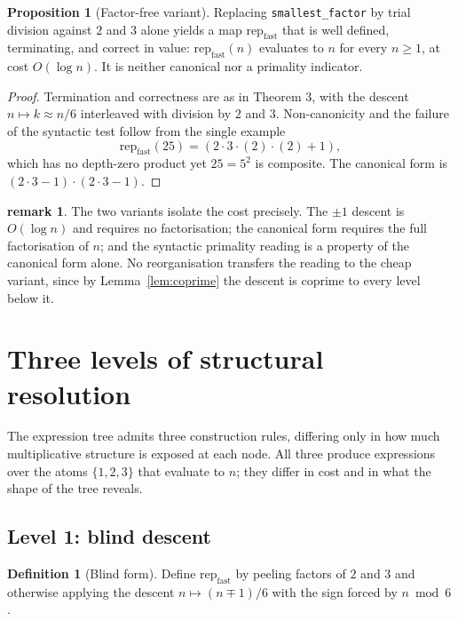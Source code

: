 \documentclass[11pt]{article}
\theoremstyle{definition}
\newtheorem{definition}{Definition}
\newtheorem{proposition}{Proposition}
\newtheorem{remark}{remark}
\begin{document}
\begin{proposition}[Factor-free variant]
Replacing \texttt{smallest\_factor} by trial division against $2$ and $3$
alone yields a map $\mathrm{rep}_{\mathrm{fast}}$ that is well defined,
terminating, and correct in value: $\mathrm{rep}_{\mathrm{fast}}(n)$ evaluates
to $n$ for every $n \ge 1$, at cost $O(\log n)$. It is neither canonical nor a
primality indicator.
\end{proposition}

\begin{proof}
Termination and correctness are as in Theorem 3, with the descent
$n \mapsto k \approx n/6$ interleaved with division by $2$ and $3$.
Non-canonicity and the failure of the syntactic test follow from the single
example
\[
  \mathrm{rep}_{\mathrm{fast}}(25) = (2\cdot3\cdot(2)\cdot(2)+1),
\]
which has no depth-zero product yet $25 = 5^2$ is composite. The canonical
form is $(2\cdot3-1)\cdot(2\cdot3-1)$.
\end{proof}

\begin{remark}
The two variants isolate the cost precisely. The $\pm1$ descent is
$O(\log n)$ and requires no factorisation; the canonical form requires the
full factorisation of $n$; and the syntactic primality reading is a property
of the canonical form alone. No reorganisation transfers the reading to the
cheap variant, since by Lemma~\ref{lem:coprime} the descent is coprime to
every level below it.
\end{remark}

\section{Three levels of structural resolution}

The expression tree admits three construction rules, differing only in how
much multiplicative structure is exposed at each node. All three produce
expressions over the atoms $\{1,2,3\}$ that evaluate to $n$; they differ in
cost and in what the shape of the tree reveals.

\subsection{Level 1: blind descent}

\begin{definition}[Blind form]
Define $\mathrm{rep}_{\mathrm{fast}}$ by peeling factors of $2$ and $3$ and
otherwise applying the descent $n \mapsto (n \mp 1)/6$ with the sign forced by
$n \bmod 6$.
\end{definition}
\end{document}
